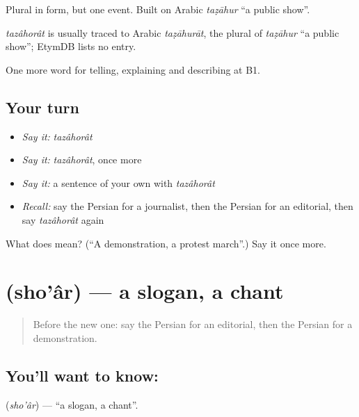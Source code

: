 Plural in form, but one event. Built on Arabic \emph{taẓāhur} \textquotedblleft{}a public show\textquotedblright{}.

\begin{cousinweb}
\emph{tazâhorât} is usually traced to Arabic \emph{taẓāhurāt}, the plural of \emph{taẓāhur} \textquotedblleft{}a public show\textquotedblright{}; EtymDB lists no entry.
\end{cousinweb}

\begin{grammarlens}[title={What you've built}]
One more word for telling, explaining and describing at B1.
\end{grammarlens}

\subsection*{Your turn}
\begin{itemize}
\raggedright
  \item \emph{Say it:} \emph{tazâhorât}
  \item \emph{Say it:} \emph{tazâhorât}, once more
  \item \emph{Say it:} a sentence of your own with \emph{tazâhorât}
  \item \emph{Recall:} say the Persian for a journalist, then the Persian for an editorial, then say \emph{tazâhorât} again
\end{itemize}

\begin{tcolorbox}[breakable,colback=teal!4,colframe=teal!35!black,title={Before you move on}]
What does  mean? (\textquotedblleft{}A demonstration, a protest march\textquotedblright{}.) Say it once more.
\end{tcolorbox}
\section[\texorpdfstring{\fa{شعار} (sho'âr)}{شعار (sho'âr)}]{ (sho'âr) — a slogan, a chant}

\label{lesson:FA-C315-shoar}



\begin{quote}
Before the new one: say the Persian for an editorial, then the Persian for a demonstration.
\end{quote}

\subsection*{You'll want to know: }
\textbf{} (\emph{sho'âr}) — \textquotedblleft{}a slogan, a chant\textquotedblright{}.


